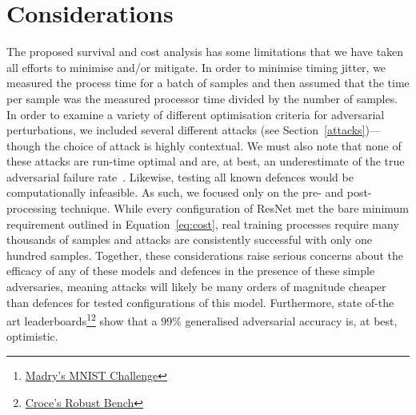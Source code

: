 \section{Considerations}
The proposed survival and cost analysis  has some limitations that we have taken all efforts to minimise and/or mitigate.
In order to minimise timing jitter, we measured the process time for a batch of samples and then assumed that the time per sample was the measured processor time divided by the number of samples.
In order to examine a variety of different optimisation criteria for adversarial perturbations, we included several different attacks (see Section~\ref{attacks})---though the choice of attack is highly contextual.
We must also note that none of these attacks are run-time optimal and are, at best, an underestimate of the true adversarial failure rate~\cite{meyers}.
Likewise, testing all known defences would be computationally infeasible.
As such, we focused only on the pre- and post-processing technique.
While every configuration of ResNet met the bare minimum requirement outlined in Equation~\ref{eq:cost}, real training processes require many thousands of samples and attacks are consistently successful with only one hundred samples.
Together, these considerations raise serious concerns about the efficacy of any of these models and defences in the presence of these simple adversaries, meaning attacks will likely be many orders of magnitude cheaper than defences for tested configurations of this model.
Furthermore, state of-the art leaderboards\footnote{\href{https://github.com/MadryLab/mnist\_challenge}{Madry's MNIST Challenge}}\footnote{\href{https://ml.cs.tsinghua.edu.cn/adv\-bench/}{Croce's Robust Bench}}
show that a 99\% generalised adversarial accuracy is, at best, optimistic.

